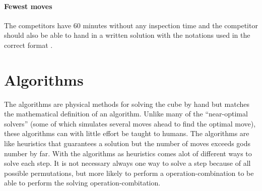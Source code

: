 \documentclass[a4paper,11pt]{kth-mag}
\begin{document}
\paragraph{Fewest moves}
The competitors have 60 minutes without any inspection time and the competitor should also be able to hand in a written solution with the notations used in the correct format \cite{WCA2}.
\section{Algorithms}
The algorithms are physical methods for solving the cube by hand but matches the mathematical definition of an algorithm. Unlike many of the “near-optimal solvers” (some of which simulates several moves ahead to find the optimal move\cite{Kociemba}), these algorithms can with little effort be taught to humans. The algorithms are like heuristics that guarantees a solution but the number of moves exceeds gods number by far. With the algorithms as heuristics comes alot of different ways to solve each step. It is not necessary always one way to solve a step because of all  possible permutations, but more likely to perform a operation-combination to be able to perform the solving operation-combitation.  
\end{document}
